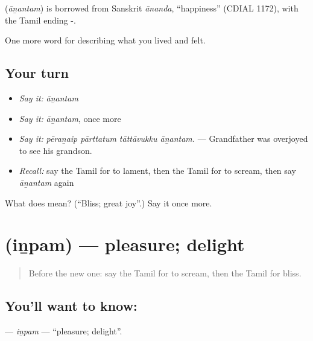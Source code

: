\begin{cousinweb}
\textbf{} (\emph{āṉantam}) is borrowed from Sanskrit \emph{ānanda}, \textquotedblleft{}happiness\textquotedblright{} (CDIAL 1172), with the Tamil ending -.
\end{cousinweb}

\begin{grammarlens}[title={What you've built}]
One more word for describing what you lived and felt.
\end{grammarlens}

\subsection*{Your turn}
\begin{itemize}
\raggedright
  \item \emph{Say it:} \emph{āṉantam}
  \item \emph{Say it:} \emph{āṉantam}, once more
  \item \emph{Say it:} \emph{pēraṉaip pārttatum tāttāvukku āṉantam.} — Grandfather was overjoyed to see his grandson.
  \item \emph{Recall:} say the Tamil for to lament, then the Tamil for to scream, then say \emph{āṉantam} again
\end{itemize}

\begin{tcolorbox}[breakable,colback=teal!4,colframe=teal!35!black,title={Before you move on}]
What does  mean? (\textquotedblleft{}Bliss; great joy\textquotedblright{}.) Say it once more.
\end{tcolorbox}
\section[\texorpdfstring{\ta{இன்பம்} (iṉpam)}{இன்பம் (iṉpam)}]{ (iṉpam) — pleasure; delight}

\label{lesson:TA-C459-inpam}



\begin{quote}
Before the new one: say the Tamil for to scream, then the Tamil for bliss.
\end{quote}

\subsection*{You'll want to know: }
\textbf{} — \emph{iṉpam} — \textquotedblleft{}pleasure; delight\textquotedblright{}.


